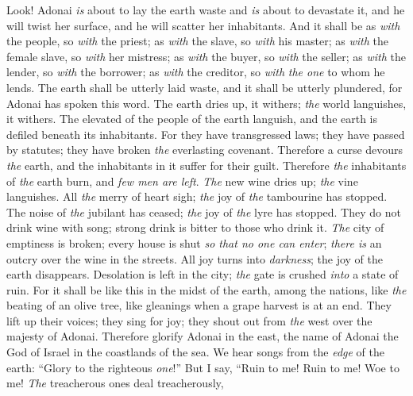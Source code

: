 \begin{biblechapter} %
 Look! Adonai \textit{is} about to lay the earth waste 
and \textit{is} about to devastate it, 
and he will twist her surface, 
and he will scatter her inhabitants.
\verse And it shall be as \textit{with} the people, so \textit{with} the priest; 
as \textit{with} the slave, so \textit{with} his master; 
as \textit{with} the female slave, so \textit{with} her mistress; 
as \textit{with} the buyer, so \textit{with} the seller; 
as \textit{with} the lender, so \textit{with} the borrower; 
as \textit{with} the creditor, so \textit{with} \textit{the one} to whom he lends.
\verse The earth shall be utterly laid waste, 
and it shall be utterly plundered, for Adonai has spoken this word.
\verse The earth dries up, it withers; 
\textit{the} world languishes, it withers. 
The elevated of the people of the earth languish,
\verse and the earth is defiled beneath its inhabitants. 
For they have transgressed laws; 
they have passed by statutes; 
they have broken \textit{the} everlasting covenant.
\verse Therefore a curse devours \textit{the} earth, 
and the inhabitants in it suffer for their guilt. 
Therefore \textit{the} inhabitants of \textit{the} earth burn, 
and \textit{few men are left}.
\verse \textit{The} new wine dries up; 
\textit{the} vine languishes. 
All \textit{the} merry of heart sigh;
\verse \textit{the} joy of \textit{the} tambourine has stopped. 
The noise of \textit{the} jubilant has ceased; 
\textit{the} joy of \textit{the} lyre has stopped.
\verse They do not drink wine with song; 
strong drink is bitter to those who drink it.
\verse \textit{The} city of emptiness is broken; 
every house is shut \textit{so that no one can enter};
\verse \textit{there is} an outcry over the wine in the streets. 
All joy turns into \textit{darkness}; 
the joy of the earth disappears.
\verse Desolation is left in the city; 
\textit{the} gate is crushed \textit{into} a state of ruin.
\verse For it shall be like this in the midst of the earth, 
among the nations, 
like \textit{the} beating of an olive tree, 
like gleanings when a grape harvest is at an end.
\verse They lift up their voices; they sing for joy; 
they shout out from \textit{the} west over the majesty of Adonai.
\verse Therefore glorify Adonai in the east, 
the name of Adonai the God of Israel in the coastlands of the sea.
\verse We hear songs from the \textit{edge} of the earth: 
“Glory to the righteous \textit{one}!” 
But I say, “Ruin to me! 
Ruin to me! Woe to me! 
\textit{The} treacherous ones deal treacherously, 

\end{biblechapter}
